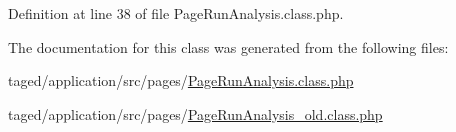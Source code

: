 Definition at line 38 of file Page\+Run\+Analysis.\+class.\+php.



The documentation for this class was generated from the following files\+:\begin{DoxyCompactItemize}
\item 
taged/application/src/pages/\hyperlink{_page_run_analysis_8class_8php}{Page\+Run\+Analysis.\+class.\+php}\item 
taged/application/src/pages/\hyperlink{_page_run_analysis__old_8class_8php}{Page\+Run\+Analysis\+\_\+old.\+class.\+php}\end{DoxyCompactItemize}
